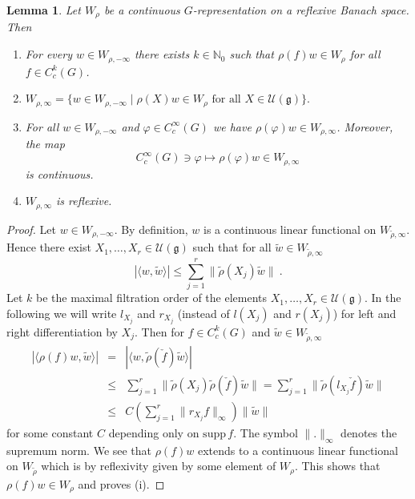 \documentclass[10]{amsart}
\newtheorem{lem}[thm]{Lemma}
\theoremstyle{remark}
\theoremstyle{definition}
\numberwithin{equation}{section}
\newcommand{\N}{\mathbb{N}}           %
\newcommand{\Hom}{\mathrm{Hom}}
\newcommand{\supp}{\mathrm{supp}}
\newcommand{\fg}{{\mathfrak g}}
\newcommand{\vp}{\varphi}
\newcommand{\Cal}{\mathcal}
\begin{document}
{\begin{lem}\label{stock}
Let $W_\rho$ be a continuous $G$-representation on a reflexive Banach space. Then
\begin{enumerate}
\item[(i)] For every $w\in W_{\rho,-\infty}$ there exists $k\in\N_0$ such that  $\rho(f) w\in W_\rho$ for all $f\in C_c^k(G)$.
\item[(ii)] $W_{\rho,\infty}=\{w\in W_{\rho,-\infty}\mid \rho(X)w\in W_\rho \mbox{ for all } X\in {\Cal U}(\fg)\}.$
\item[(iii)] For all  $w\in W_{\rho,-\infty}$ and $\vp\in C_c^\infty(G)$ we have $\rho(\vp)w\in W_{\rho,\infty}$. Moreover, 
the map
$$  C^\infty_c(G)\ni\vp \mapsto \rho(\vp) w\in  W_{\rho,\infty} $$
is continuous.
\item[(iv)] $W_{\rho,\infty}$ is reflexive.
\end{enumerate}
\end{lem}
\begin{proof} Let $w\in W_{\rho,-\infty}$. By definition, $w$ is a continuous linear functional on $W_{\tilde \rho,\infty}$. Hence there exist $X_1,\dots,X_r\in {\Cal U}(\fg)$
such that for all $\tilde w\in W_{\tilde \rho,\infty}$
$$  |\langle w,\tilde w\rangle |\le \sum_{j=1}^{r}\|\tilde\rho(X_j)\tilde w\|\ .$$
Let $k$ be the maximal filtration order of the elements $X_1,\dots,X_r\in  {\Cal U}(\fg)$. In the following we will write $l_{X_j}$ and $r_{X_j}$ (instead of $l(X_j)$ and $r(X_j)$) for left and right differentiation by $X_j$. Then for $f\in C^k_c(G)$ and $\tilde w\in W_{\tilde \rho,\infty}$
\begin{eqnarray}
|\langle \rho(f)w,\tilde w\rangle|&=&|\langle w,\tilde\rho(\check f)\tilde w\rangle| \nonumber\\
&\le &\sum_{j=1}^{r}\|\tilde\rho(X_j)\tilde\rho(\check f)\tilde w\|
= \sum_{j=1}^{r}\|\tilde\rho(l_{X_j}\check f)\tilde w\|\nonumber\\
&\le& C \left ( \sum_{j=1}^{r}\| r_{X_j}f\|_\infty\right )\|\tilde w\| \label{korbinian}
\end{eqnarray}
for some constant $C$ depending only on $\supp\, f$. The symbol $\|.\|_\infty$ denotes the supremum norm. 
We see that $\rho(f)w$ extends to a continuous linear functional on $W_{\tilde \rho}$
which is by reflexivity given by some element of $W_\rho$. This shows that $\rho(f)w\in W_\rho$ and proves (i).


\end{proof}}
\end{document}
